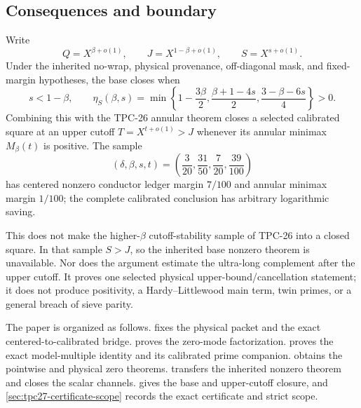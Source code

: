 \subsection{Consequences and boundary}

Write
\begin{equation}
 Q=X^{\beta+o(1)},
 \qquad J=X^{1-\beta+o(1)},
 \qquad S=X^{s+o(1)}.
 \label{eq:tpc27-intro-exponents}
\end{equation}
Under the inherited no-wrap, physical provenance, off-diagonal mask,
and fixed-margin hypotheses, the base closes when
\begin{equation}
 s<1-\beta,
 \qquad
 \eta_S(\beta,s)=
 \min\left\{
 1-\frac{3\beta}{2},
 \frac{\beta+1-4s}{2},
 \frac{3-\beta-6s}{4}
 \right\}>0.
 \label{eq:tpc27-intro-base-region}
\end{equation}
Combining this with the TPC-26 annular theorem closes a selected
calibrated square at an upper cutoff \(T=X^{t+o(1)}>J\) whenever its
annular minimax \(M_\beta(t)\) is positive.  The sample
\begin{equation}
 (\delta,\beta,s,t)=
 \left(\frac3{20},\frac{31}{50},\frac7{20},\frac{39}{100}\right)
 \label{eq:tpc27-intro-strict-sample}
\end{equation}
has centered nonzero conductor ledger margin \(7/100\) and annular
minimax margin \(1/100\); the complete calibrated conclusion has arbitrary
logarithmic saving.

This does not make the higher-\(\beta\) cutoff-stability sample of
TPC-26 into a closed square.  In that sample \(S>J\), so the inherited
base nonzero theorem is unavailable.  Nor does the argument estimate
the ultra-long complement after the upper cutoff.  It proves one
selected physical upper-bound/cancellation statement; it does not
produce positivity, a Hardy--Littlewood main term, twin primes, or a
general breach of sieve parity.

The paper is organized as follows.  
fixes the physical packet and the exact centered-to-calibrated bridge.
 proves the zero-mode
factorization.   proves the exact
model-multiple identity and its calibrated prime companion.
 obtains the pointwise and physical
zero theorems.   transfers the inherited
nonzero theorem and closes the scalar channels.
 gives the base and upper-cutoff
closure, and \cref{sec:tpc27-certificate-scope} records the exact
certificate and strict scope.
